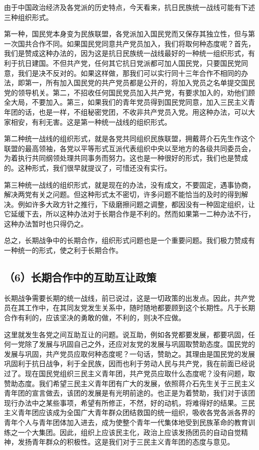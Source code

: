 由于中国政治经济及各党派的历史特点，今天看来，抗日民族统一战线可能有下述三种组织形式。

第一种，国民党本身变为民族联盟，各党派加入国民党而又保存其独立性，但与第一次国共合作不同。如果国民党同意共产党员加入，我们将取何种态度呢？首先，我们是赞成这种办法的，因为这是抗日民族统一战线最好的一种统一组织形式，有利于抗日建国。不但共产党，任何其它抗日党派都可加人国民党，只要国民党同意，我们是决不反对的。如果这样做，那我们可以实行同十三年合作不相同的办法，即第一，所有加入国民党的共产党员都是公开的，将加入党员之名单提交国民党的领导机关。第二，不招收任何国民党员加入共产党，有要求加入的，劝他们顾全大局，不要加入。第三，如果我们的青年党员得到国民党同意，加入三民主义青年团的话，也是一样，不组秘密党团，不收非共产党员入党。用这种办法，可以大家相安，有利无害。这是第一种统一战线的组织形式。

第二种统一战线的组织形式，就是各党共同组织民族联盟，拥戴蒋介石先生作这个联盟的最高领袖，各党以平等形式互派代表组织中央以至地方的各级共同委员会，为着执行共同纲领处理共同事务而努力。这也是一种很好的形式，我们也是赞成的。这种形式，我们很早就提议了，可惜还没有实行。

第三种统一战线的组织形式，就是现在的办法，没有成文，不要固定，遇事协商，解决两党有关之问题。但这种形式太不密切，许多问题不能恰当的及时的得到解决。例如许多大政方针之推行，下级磨擦问题之调整，都因没有一种固定组织，让它延缓下去，所以这种办法对于长期合作是不利的。然而如果第一二种办法不行，这种办法暂时也只得仍之。

总之，长期战争中的长期合作，组织形式问题也是一个重要问题。我们极力赞成有一种统一的形式，使之利于长期合作。

\subsection{（6）长期合作中的互助互让政策}

长期战争需要长期的统一战线，前已说过，这是一切政策的出发点。因此，共产党员在其工作中，在其同友党发生关系中，随时随地都要顾到这个长期性。凡于长期合作有利的，应该坚决的勇敢的做，不利的，则决不应做。

这里就发生各党之间互助互让的问题。说互助，例如各党都要发展，都要巩固，任何一党除了发展与巩固自己之外，还应对友党的发展与巩固取赞助态度。国民党的发展与巩固，共产党员应取何种态度呢？一句话，赞助之。其理由是国民党的发展巩固利于抗日战争，利于全民族，因而也利于劳动人民与共产党，我在前面已经说过了。现在国民党组织三民主义青年团，共产党员应取什么态度呢？没有问题，取赞助态度。我们希望三民主义青年团有广大的发展，依照蒋介石先生关于三民主义青年团的宣言做去，该团的发展是有光明前途的。也正是为着赞助，我们对于该团现行办法中之某些事项，希望有所修正，不然，好的动机，将难得好的结果。三民主义青年团应该成为全国广大青年群众团结救国的统一组织，吸收各党各派各界的青年个人与青年团体加入进去，成为使整个青年一代集体地受到民族革命的教育训练之一个大集团。因此，组织上应该民主化，政治上应该发扬团员的自动自觉精神，发扬青年群众的积极性。这是我们对于三民主义青年团的态度与意见。

